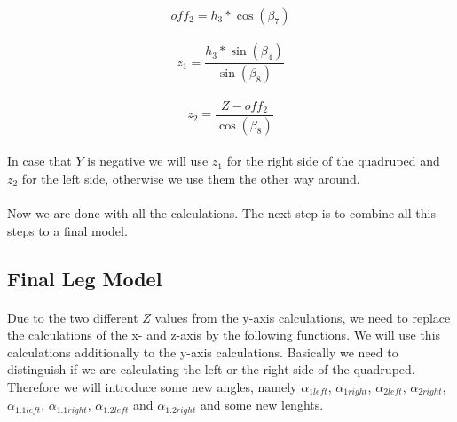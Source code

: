 \documentclass{article}
\begin{document}
    \paragraph{}
    \begin{equation}
        off_2 = h_3 * \cos(\beta_7)
    \end{equation}

    \paragraph{}
    \begin{equation}
        z_1 = \frac{h_3 * \sin(\beta_4)}{\sin(\beta_8)}
    \end{equation}

    \paragraph{}
    \begin{equation}
        z_2 = \frac{Z - off_2}{\cos(\beta_8)}
    \end{equation}

    \paragraph{}
    In case that $Y$ is negative we will use $z_1$ for the right side of the quadruped and $z_2$ for the left side, otherwise we use them the other way around.

    \paragraph{}
    Now we are done with all the calculations. The next step is to combine all this steps to a final model. 
    


    \subsection{Final Leg Model}
    \paragraph{}
    Due to the two different $Z$ values from the y-axis calculations, we need to replace the calculations of the x- and z-axis by the following functions. We will use this calculations additionally to the y-axis calculations. Basically we need to distinguish if we are calculating the left or the right side of the quadruped. Therefore we will introduce some new angles, namely $\alpha_{1left}$, $\alpha_{1right}$, $\alpha_{2left}$, $\alpha_{2right}$, $\alpha_{1.1left}$, $\alpha_{1.1right}$, $\alpha_{1.2left}$ and $\alpha_{1.2right}$ and some new lenghts.
\end{document}
